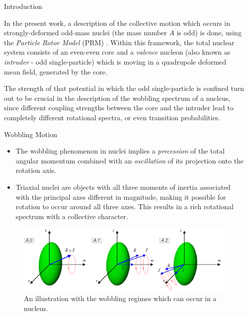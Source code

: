 \documentclass[final]{beamer}
\newlength{\sepwidth}
\newlength{\colwidth}
\newcommand{\separatorcolumn}{\begin{column}{\sepwidth}\end{column}}
\begin{document}
\begin{frame}[t]
\begin{columns}[t]
\separatorcolumn

\begin{column}{\colwidth}

  \begin{block}{Introduction}

In the present work, a description of the collective motion which occurs in strongly-deformed odd-mass nuclei (the mass number $A$ is odd) is done, using the \emph{Particle Rotor Model} (PRM) \cite{bohr1998nuclear}. Within this framework, the total nuclear system consists of an even-even core and a \emph{valence} nucleon (also known as \emph{intruder} - odd single-particle) which is moving in a quadrupole deformed mean field, generated by the core.

The strength of that potential in which the odd single-particle is confined turn out to be crucial in the description of the wobbling spectrum of a nucleus, since different coupling strengths between the core and the intruder lead to completely different rotational spectra, or even transition probabilities.

  \end{block}

  \begin{block}{Wobbling Motion}
  
\begin{itemize}
    \item The wobbling phenomenon in nuclei implies a \emph{precession} of the total angular momentum combined with an \emph{oscillation} of its projection onto the rotation axis.
    \item Triaxial nuclei are objects with all three moments of inertia associated with the principal axes different in magnitude, making it possible for rotation to occur around all three axes. This results in a rich rotational spectrum with a collective character.
\end{itemize}

\begin{figure}
      \centering
      \includegraphics[scale=1.3]{images/wobbling_Regimes_COUPLING_SCHEME.pdf}
      \caption{An illustration with the wobbling regimes which can occur in a nucleus.}
      \label{wobbling-regimes}
  \end{figure}


\end{block}
\end{column}
\end{columns}
\end{frame}
\end{document}
